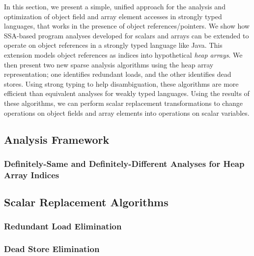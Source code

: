 In this section, we present a simple, unified approach for the analysis and
optimization of 
object field and array element accesses in strongly typed languages, 
that works in the presence of
object references/pointers.
We show how SSA-based program
analyses developed for scalars and arrays can be extended to
operate on object references in a strongly typed language like Java.
This extension models object references as
indices into hypothetical {\em heap arrays}.
We then present two new sparse analysis
algorithms using
the heap array representation; one identifies redundant loads, and the
other identifies dead stores.
Using strong typing to help disambiguation, these algorithms are
more efficient than equivalent analyses for weakly typed languages.
Using the results of these algorithms, we can perform scalar replacement
transformations to change operations on object fields
and array elements into operations on scalar
variables.  

\subsection{Analysis Framework}\label{model}

\subsubsection{ Definitely-Same and Definitely-Different Analyses for Heap Array Indices}\label{svalnum}

\subsection{Scalar Replacement Algorithms}
\label{scalrep}

\subsubsection{Redundant Load Elimination}
\label{alg}

\subsubsection{Dead Store Elimination}\label{store}
